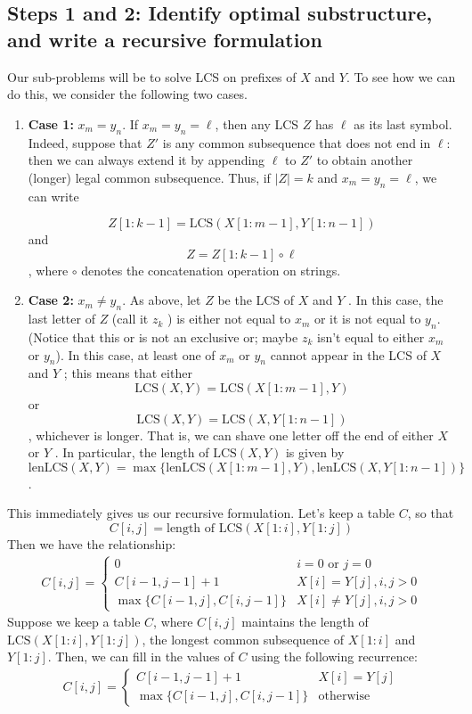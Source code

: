 \documentclass [12pt]{article}
\theoremstyle{definition}
\begin{document}
\subsection{Steps 1 and 2: Identify optimal substructure, and write a recursive
formulation}

Our sub-problems will be to solve LCS on prefixes of $X$ and $Y$. To see how we can do this, we consider the following two cases. 

\begin{enumerate}
  \item \textbf{Case 1:} $x_m = y_n$. If $x_m = y_n = \ell$, then any LCS $Z$ has $\ell$ as its last symbol. Indeed, suppose that $Z'$ is any common subsequence that does not end in $\ell$: then we can always extend it by appending $\ell$ to $Z'$ to obtain another (longer) legal common subsequence. Thus, if $|Z| = k$ and $x_m = y_n = \ell$, we can write 

  $$
  Z[1 : k - 1] = \text{LCS}(X[1 : m - 1], Y [1 : n - 1])
  $$ and 
  $$
  Z = Z[1 : k - 1] \circ \ell 
  $$, 
  where $\circ$ denotes the concatenation operation on strings.
  \item \textbf{Case 2:} $x_m \neq y_n$. As above, let $Z$ be the LCS of $X$ and $Y$ . In this case, the last letter of $Z$ (call it $z_k$ ) is either not equal to $x_m$ or it is not equal to $y_n$. (Notice that this or is not an exclusive or; maybe $z_k$ isn't equal to either $x_m$ or $y_n$). In this case, at least one of $x_m$ or $y_n$ cannot appear in the LCS of $X$ and $Y$ ; this means that either 
  $$
    \text{LCS}(X, Y ) = \text{LCS}(X[1 : m - 1], Y )
  $$ 
  or 
  $$
  \text{LCS}(X, Y ) = \text{LCS}(X, Y [1 : n - 1])
  $$,
  whichever is longer. That is, we can shave one letter off the end of either $X$ or $Y$ . In particular, the length of $\text{LCS}(X, Y )$ is given by 
  $$
  \text{lenLCS}(X, Y ) = \max \{\text{lenLCS}(X[1 : m - 1], Y ), \text{lenLCS}(X, Y [1 : n - 1])\}
  $$.
\end{enumerate}

This immediately gives us our recursive formulation. Let's keep a table $C$, so that
$$
C[i,j] = \text{length of LCS}(X[1:i], Y[1:j])
$$
Then we have the relationship:
\begin{align*}
C[i,j] = \begin{cases}
  0 & i = 0 \text{ or } j = 0 \\
  C[i-1, j-1] +1 & X[i] = Y[j], i,j > 0  \\
  \max\{C[i-1, j], C[i, j-1] \} & X[i] \neq Y[j], i,j > 0
\end{cases}
\end{align*}
Suppose we keep a table $C$, where $C[i, j]$ maintains the length of $\text{LCS}(X[1 : i], Y [1 : j])$, the longest common subsequence of $X[1 : i]$ and $Y [1 : j]$. Then, we can fill in the values of $C$ using the following recurrence:
\begin{align*}
C[i,j] = \begin{cases}
  C[i-1, j-1] +1 & X[i] = Y[j]  \\
  \max\{C[i-1, j], C[i, j-1] \} & \text{otherwise}
\end{cases}
\end{align*}
\end{document}
